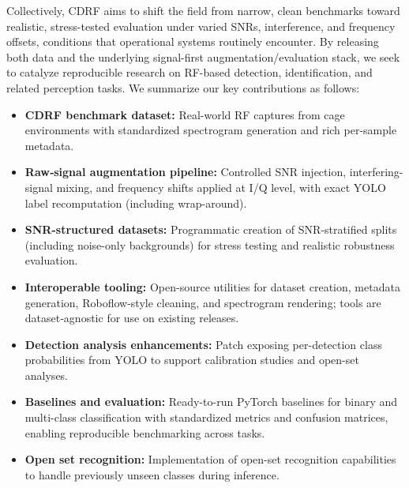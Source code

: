 Collectively, CDRF aims to shift the field from narrow, clean benchmarks toward realistic, stress-tested evaluation under varied SNRs, interference, and frequency offsets, conditions that operational systems routinely encounter. By releasing both data and the underlying signal-first augmentation/evaluation stack, we seek to catalyze reproducible research on RF-based detection, identification, and related perception tasks. We summarize our key contributions as follows:
\begin{itemize}
    \item \textbf{CDRF benchmark dataset:} Real-world RF captures from cage environments with standardized spectrogram generation and rich per-sample metadata.
    \item \textbf{Raw‑signal augmentation pipeline:} Controlled SNR injection, interfering-signal mixing, and frequency shifts applied at I/Q level, with exact YOLO label recomputation (including wrap-around).
    \item \textbf{SNR-structured datasets:} Programmatic creation of SNR‑stratified splits (including noise-only backgrounds) for stress testing and realistic robustness evaluation.
    \item \textbf{Interoperable tooling:} Open-source utilities for dataset creation, metadata generation, Roboflow-style cleaning, and spectrogram rendering; tools are dataset‑agnostic for use on existing releases.
    \item \textbf{Detection analysis enhancements:} Patch exposing per-detection class probabilities from YOLO to support calibration studies and open-set analyses.
    \item \textbf{Baselines and evaluation:} Ready-to-run PyTorch baselines for binary and multi-class classification with standardized metrics and confusion matrices, enabling reproducible benchmarking across tasks.
    \item \textbf{Open set recognition:} Implementation of open-set recognition capabilities to handle previously unseen classes during inference.
\end{itemize}

